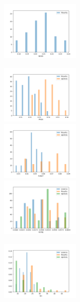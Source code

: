 \documentclass[10pt,a4paper,onecolumn]{article}
\theoremstyle{definition}
\theoremstyle{remark}
\begin{document}
\begin{figure}[htpb!]
\begin{multicols}{3}
	\includegraphics[width=0.33\textwidth]{graficos/histograma_NOUN.png}  \\
\end{multicols}
\begin{multicols}{3}
	\includegraphics[width=0.33\textwidth]{graficos/histograma_PRON.png}  \\
	\includegraphics[width=0.33\textwidth]{graficos/histograma_PUNCT.png}  \\
	\includegraphics[width=0.33\textwidth]{graficos/histograma_SCONJ.png}  \\
	\end{multicols}
\begin{multicols}{2}
	\hspace*{1.75cm}
	\includegraphics[width=0.33\textwidth]{graficos/histograma_len.png} \\ \hspace*{1.75cm}  \\

\end{multicols}
\end{figure}
\end{document}
